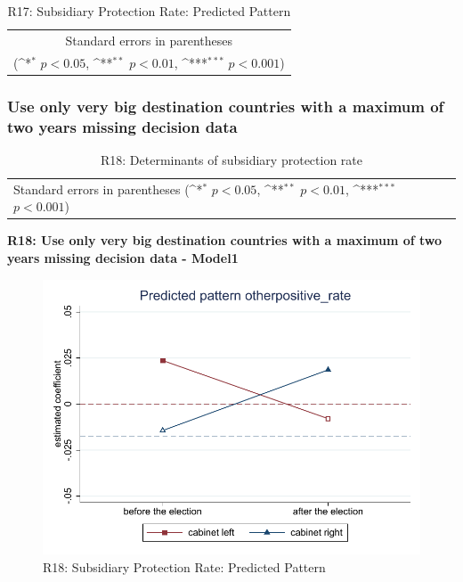 \documentclass[10pt,a4paper]{scrartcl}
\begin{document}
\begin{table}[!ht]\centering
	\footnotesize
	\renewcommand{\arraystretch}{1.15}
	\def\sym#1{\ifmmode^{#1}\else\(^{#1}\)\fi}
	\caption{R17: Subsidiary Protection Rate: Predicted Pattern}
	\begin{tabular}{l*{2}{c}}
		\hline\hline
		
		\hline\hline
		\multicolumn{3}{c}{\footnotesize Standard errors in parentheses} \\
		\multicolumn{3}{c}{\footnotesize (\sym{*} \(p<0.05\), \sym{**} \(p<0.01\), \sym{***} \(p<0.001\))} \\
	\end{tabular}
\end{table}




\clearpage
\FloatBarrier
\subsubsection{Use only very big destination countries with a maximum of two years missing decision data}
\begin{table}[!ht]\centering
	\renewcommand{\arraystretch}{1.25}
	\small
	\def\sym#1{\ifmmode^{#1}\else\(^{#1}\)\fi}
	\caption{R18: Determinants of subsidiary protection rate}
	\begin{tabular}{l*{3}{c}}
		\hline\hline
		
		\hline\hline
		\multicolumn{4}{l}{\footnotesize Standard errors in parentheses (\sym{*} \(p<0.05\), \sym{**} \(p<0.01\), \sym{***} \(p<0.001\))}\\
	\end{tabular}
\end{table}

\clearpage
\textbf{R18: Use only very big destination countries with a maximum of two years missing decision data - Model1}
\begin{figure}[!ht]
	\centering
	\includegraphics[width=1\textwidth]{figures_edited/otherpositive_rate_graph1_R18.pdf}
	\caption{R18: Subsidiary Protection Rate: Predicted Pattern}
\end{figure}
\end{document}
